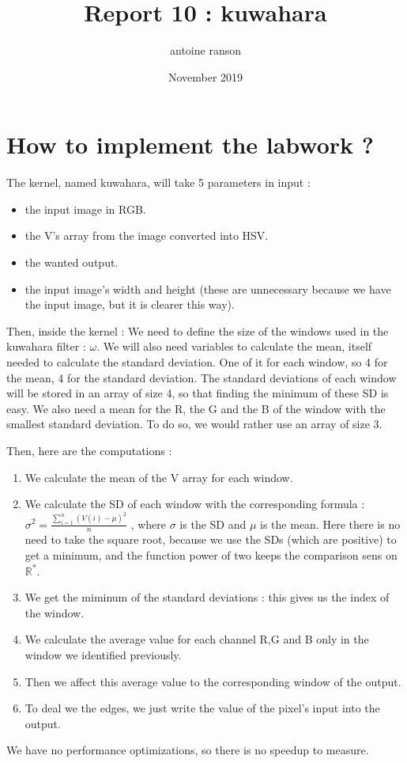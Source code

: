 \documentclass{article}
\title{Report 10 : kuwahara}
\author{antoine ranson }
\date{November 2019}
\begin{document}
 

\maketitle 

\section{How to implement the labwork ?}

 The kernel, named kuwahara, will take 5 parameters in input : 
\begin{itemize} 
\item the input image in RGB. 
\item the V's array from the image converted into HSV. 
\item the wanted output. 
\item the input image's width and height (these are unnecessary because we have the input image, but it is clearer this way). \end{itemize} 


Then, inside the kernel :\newline 
We need to define the size of the windows used in the kuwahara filter : $\omega$. We will also need variables to calculate the mean, itself needed to calculate the standard deviation. 
One of it for each window, so 4 for the mean, 4 for the standard deviation. The standard deviations of each 
window will be stored in an array of size 4, so that finding the minimum of these SD is easy. We also need a 
mean for the R, the G and the B of the window with the smallest standard deviation. To do so, we would rather 
use an array of size 3. \newline 

Then, here are the computations : 
\begin{enumerate} 
\item We calculate the mean of the V array for each window. 
\item We calculate the SD of each window with the corresponding formula : $ \sigma^2 = \frac{\displaystyle\sum_{i=1}^{n}(V(i) - \mu)^2 }{n} $ , where $\sigma$ is the SD and $\mu$ is the 
mean. Here there is no need to take the square root, because we use the SDs (which are positive) to get a 
minimum, and the function power of two keeps the comparison sens on $\mathbb{R}^{*}$.
\item We get the miminum of the standard deviations : this gives us the index of the window. 
\item We calculate the average value for each channel R,G and B only in the window we identified previously. 
\item Then we affect this average value to the corresponding window of the output. 
\item To deal we the edges, we just write the value of the pixel's input into the output. 

\end{enumerate} 

We have no performance optimizations, so there is no speedup to measure.
\end{document}
